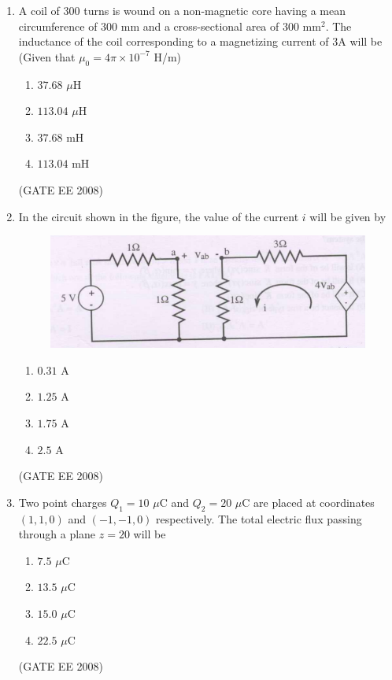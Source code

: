 \documentclass[journal,12pt,onecolumn]{IEEEtran}
\theoremstyle{remark}
\begin{document}
\begin{enumerate}[start=1, label=Q.\arabic*]
\item A coil of 300 turns is wound on a non-magnetic core having a mean circumference of 300 mm and a cross-sectional area of 300 mm$^{2}$. The inductance of the coil corresponding to a magnetizing current of 3A will be (Given that $\mu_0 = 4\pi \times 10^{-7}$ H/m)

\begin{multicols}{4}
\begin{enumerate}
    \item $37.68$ $\mu$H
    \item $113.04$ $\mu$H
    \item $37.68$ mH
    \item $113.04$ mH
\end{enumerate}
\end{multicols}
\hfill (GATE EE 2008)

\item In the circuit shown in the figure, the value of the current $i$ will be given by

\begin{figure}[H]
    \centering
    \includegraphics[width=\columnwidth]{Fig/q26.png}
    \caption{}
\end{figure}

\begin{multicols}{4}
\begin{enumerate}
    \item $0.31$ A
    \item $1.25$ A
    \item $1.75$ A
    \item $2.5$ A
\end{enumerate}
\end{multicols}
\hfill (GATE EE 2008)


\item Two point charges $Q_1 = 10$ $\mu$C and $Q_2 = 20$ $\mu$C are placed at coordinates $(1, 1, 0)$ and $(-1, -1, 0)$ respectively. The total electric flux passing through a plane $z = 20$ will be

\begin{multicols}{4}
\begin{enumerate}
    \item $7.5$ $\mu$C
    \item $13.5$ $\mu$C
    \item $15.0$ $\mu$C
    \item $22.5$ $\mu$C
\end{enumerate}
\end{multicols}
\hfill (GATE EE 2008)



\end{enumerate}
\end{document}
